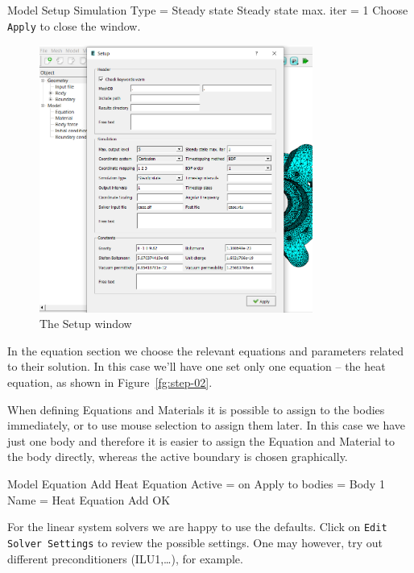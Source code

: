 \ttbegin
Model
  Setup 
    Simulation Type = Steady state
    Steady state max. iter = 1
\ttend
Choose \texttt{Apply} to close the window.

\begin{figure}[H]
\begin{center}
\includegraphics[width=0.8\textwidth]{step-01}
\caption{The Setup window}\label{fg:step-01}
\end{center}
\end{figure}

In the equation section we choose the relevant equations and parameters related to their solution.  In this case we'll have one set only one equation -- the heat equation, as shown in Figure~\ref{fg:step-02}.

When defining Equations and Materials it is possible to assign to the bodies immediately, or to use mouse selection to assign them later. In this case we have just one body and therefore it is easier to assign the Equation and Material to the body directly, whereas the active boundary is chosen graphically.

\ttbegin
Model
  Equation
    Add 
      Heat Equation
        Active = on
      Apply to bodies = Body 1
      Name = Heat Equation
      Add   
      OK
\ttend        

For the linear system solvers we are happy to use the defaults.  Click on  \texttt{Edit Solver Settings} to review the possible settings.  One may however, try out different preconditioners (ILU1,\ldots), for example.

